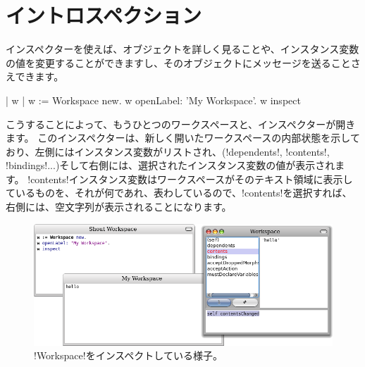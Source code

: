 \documentclass[a4paper,10pt,twoside]{book}
\begin{document}
\section{イントロスペクション}

インスペクターを使えば、オブジェクトを詳しく見ることや、インスタンス変数の値を変更することができますし、そのオブジェクトにメッセージを送ることさえできます。

\begin{code}{| w |}
w := Workspace new.
w openLabel: 'My Workspace'.
w inspect
\end{code}

こうすることによって、もうひとつのワークスペースと、インスペクターが開きます。
このインスペクターは、新しく開いたワークスペースの内部状態を示しており、左側にはインスタンス変数がリストされ、(\ct!dependents!, \ct!contents!, \ct!bindings!...)そして右側には、選択されたインスタンス変数の値が表示されます。
\ct!contents!インスタンス変数はワークスペースがそのテキスト領域に表示しているものを、それが何であれ、表わしているので、\ct!contents!を選択すれば、右側には、空文字列が表示されることになります。

\begin{figure}[ht]\centering
	\includegraphics[width=\linewidth]{workspaceInspector}
	\caption{\ct!Workspace!をインスペクトしている様子。}
\end{figure}
\end{document}
